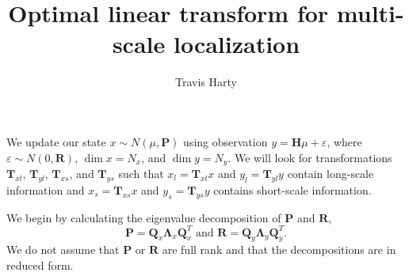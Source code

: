 \documentclass[11pt]{article} %
\title{Optimal linear transform for multi-scale localization}
\author{Travis Harty}
\date{} %
\newcommand{\mat}{\mathbf}
\begin{document}
\maketitle

We update our state $x\sim N(\mu, \mat{P})$ using observation
$y = \mat{H} \mu + \varepsilon$, where $\varepsilon \sim N(0, \mat{R})$,
$\dim{x} = N_x$, and $\dim{y} = N_y$.
We will look for transformations $\mat{T}_{xl}$, $\mat{T}_{yl}$,
$\mat{T}_{xs}$, and $\mat{T}_{ys}$ such that $x_{l} = \mat{T}_{xl} x$
and $y_{l} = \mat{T}_{yl} y$ contain long-scale information and $x_s =
\mat{T}_{xs} x$ and $y_s = \mat{T}_{ys} y$ contains short-scale
information.

We begin by calculating the eigenvalue decomposition of $\mat{P}$ and
$\mat{R}$,
\[
  \mat{P} = \mat{Q}_x \mat{\Lambda}_x \mat{Q}_x^T
  \text{ and }
  \mat{R} = \mat{Q}_y \mat{\Lambda}_y \mat{Q}_y^T.
\]
We do not assume that $\mat{P}$ or $\mat{R}$ are full rank and that
the decompositions are in reduced form.
\end{document}
